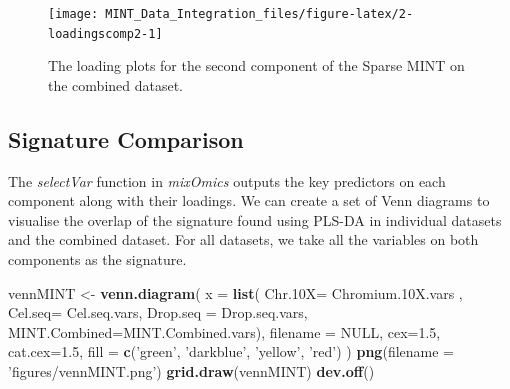 \documentclass[]{book}
\newenvironment{Shaded}{\begin{snugshade}}{\end{snugshade}}
\newcommand{\CommentTok}[1]{\textcolor[rgb]{0.56,0.35,0.01}{\textit{#1}}}
\newcommand{\DataTypeTok}[1]{\textcolor[rgb]{0.13,0.29,0.53}{#1}}
\newcommand{\DecValTok}[1]{\textcolor[rgb]{0.00,0.00,0.81}{#1}}
\newcommand{\FloatTok}[1]{\textcolor[rgb]{0.00,0.00,0.81}{#1}}
\newcommand{\KeywordTok}[1]{\textcolor[rgb]{0.13,0.29,0.53}{\textbf{#1}}}
\newcommand{\NormalTok}[1]{#1}
\newcommand{\OperatorTok}[1]{\textcolor[rgb]{0.81,0.36,0.00}{\textbf{#1}}}
\newcommand{\OtherTok}[1]{\textcolor[rgb]{0.56,0.35,0.01}{#1}}
\newcommand{\StringTok}[1]{\textcolor[rgb]{0.31,0.60,0.02}{#1}}
\theoremstyle{definition}
\theoremstyle{definition}
\theoremstyle{definition}
\theoremstyle{remark}
\begin{document}
\begin{figure}[ht]

{\centering \texttt{[image: MINT\_Data\_Integration\_files/figure-latex/2-loadingscomp2-1]} 

}

\caption{The loading plots for the second component of the Sparse MINT on the combined dataset.}\label{fig:2-loadingscomp2}
\end{figure}

\hypertarget{signature-comparison}{%
\subsection{Signature Comparison}\label{signature-comparison}}

The \emph{selectVar} function in \emph{mixOmics} outputs the key
predictors on each component along with their loadings. We can create a
set of Venn diagrams to visualise the overlap of the signature found
using PLS-DA in individual datasets and the combined dataset. For all
datasets, we take all the variables on both components as the signature.

\begin{Shaded}
\end{Shaded}

\begin{Shaded}
\begin{Highlighting}[]
\NormalTok{vennMINT <-}\StringTok{ }\KeywordTok{venn.diagram}\NormalTok{(}
    \DataTypeTok{x =} \KeywordTok{list}\NormalTok{(}
        \DataTypeTok{Chr.10X=}\NormalTok{ Chromium}\FloatTok{.10}\NormalTok{X.vars ,}
        \DataTypeTok{Cel.seq=}\NormalTok{ Cel.seq.vars,}
        \DataTypeTok{Drop.seq =}\NormalTok{ Drop.seq.vars,}
        \DataTypeTok{MINT.Combined=}\NormalTok{MINT.Combined.vars),}
    \DataTypeTok{filename =} \OtherTok{NULL}\NormalTok{,}
    \DataTypeTok{cex=}\FloatTok{1.5}\NormalTok{, }\DataTypeTok{cat.cex=}\FloatTok{1.5}\NormalTok{,}
    \DataTypeTok{fill =} \KeywordTok{c}\NormalTok{(}\StringTok{'green'}\NormalTok{, }\StringTok{'darkblue'}\NormalTok{,  }\StringTok{'yellow'}\NormalTok{, }\StringTok{'red'}\NormalTok{)}
\NormalTok{    )}
\KeywordTok{png}\NormalTok{(}\DataTypeTok{filename =} \StringTok{'figures/vennMINT.png'}\NormalTok{)}
\KeywordTok{grid.draw}\NormalTok{(vennMINT)}
\KeywordTok{dev.off}\NormalTok{()}
\end{Highlighting}
\end{Shaded}
\end{document}
